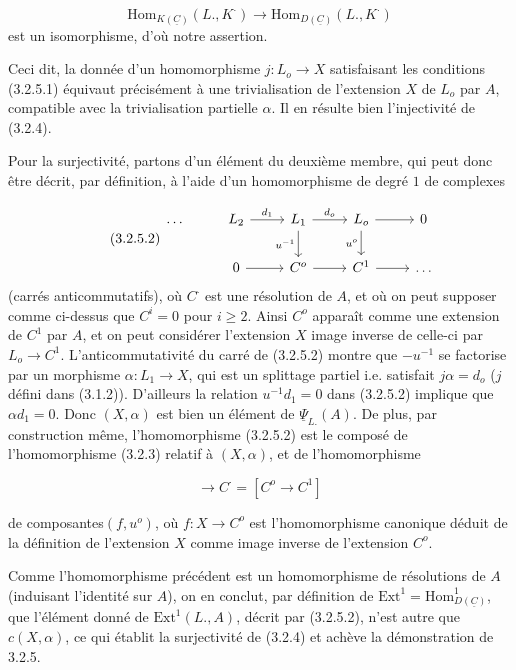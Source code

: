 \begin{equation*}
\mathrm{Hom}_{K(\underline{C})}(L.,K^{\cdot}) \longrightarrow \mathrm{Hom}_{D(\underline{C})}(L.,K^{\cdot})
\end{equation*}
est un isomorphisme, d'où notre assertion.

Ceci dit, la donnée d'un homomorphisme $j : L_o \longrightarrow X$ satisfaisant les conditions (3.2.5.1) équivaut précisément à une trivialisation de l'extension $X$ de $L_o$ par $A$, compatible avec la trivialisation partielle $\alpha$. Il en résulte bien l'injectivité de (3.2.4).

Pour la surjectivité, partons d'un élément du deuxième membre, qui peut donc être décrit, par définition, à l'aide d'un homomorphisme de degré $1$ de complexes

\begin{equation}\tag{3.2.5.2}
\begin{tikzcd}
\ldots & L_2 \arrow[r, "d_1"] & L_1 \arrow[r, "d_o"] \arrow[d, "u^{-1}"'] & L_o \arrow[r] \arrow[d, "u^o"'] & 0 \\
 & 0 \arrow[r] & C^o \arrow[r] & C^1 \arrow[r] & \ldots
\end{tikzcd}
\end{equation}
(carrés anticommutatifs), où $C^{\cdot}$ est une résolution de $A$, et où on peut supposer comme ci-dessus que $C^i=0$ pour $i \geqslant 2$. Ainsi $C^o$ apparaît comme une extension de $C^1$ par $A$, et on peut considérer l'extension $X$ image inverse de celle-ci par $L_o \to C^1$. L'anticommutativité du carré de (3.2.5.2) montre que $-u^{-1}$ se factorise par un morphisme $\alpha : L_1 \longrightarrow X$, qui est un splittage partiel i.e. satisfait $j\alpha = d_o$ ($j$ défini dans (3.1.2)). D'ailleurs la relation $u^{-1}d_1 = 0$ dans (3.2.5.2) implique que $\alpha d_1 = 0$. Donc $(X,\alpha)$ est bien un élément de $\underline{\Psi}_{L.}(A)$. De plus, par construction même, l'homomorphisme (3.2.5.2) est le composé de l'homomorphisme (3.2.3) relatif à $(X,\alpha)$, et de l'homomorphisme

\begin{equation*}
[X \longrightarrow L_o] \longrightarrow C^{\cdot} = [C^o \longrightarrow C^1] 
\end{equation*}


 de composantes$(f,u^o)$, où $f: X \longrightarrow C^o$ est l'homomorphisme canonique déduit de la définition de l'extension $X$ comme image inverse de l'extension $C^o$.

Comme l'homomorphisme précédent est un homomorphisme de résolutions de $A$ (induisant l'identité sur $A$), on en conclut, par définition de $\mathrm{Ext}^1 = \mathrm{Hom}^1_{D(\underline{C})}$, que l'élément donné de $\mathrm{Ext}^1(L.,A)$, décrit par (3.2.5.2), n'est autre que $c(X,\alpha)$, ce qui établit la surjectivité de (3.2.4) et achève la démonstration de 3.2.5.



